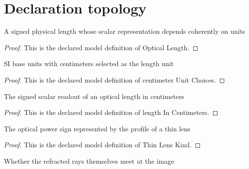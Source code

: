 \section{Declaration topology}
\begin{definition}
  \label{def:physics:phyx-mini-0159:phyxminiproblems-problemphyxmini0159-opticallength}
  A signed physical length whose scalar representation depends coherently on units
\end{definition}
\begin{proof}
  This is the declared model definition of Optical Length.
\end{proof}
\begin{definition}
  \label{def:physics:phyx-mini-0159:phyxminiproblems-problemphyxmini0159-centimeterunitchoices}
  SI base units with centimeters selected as the length unit
\end{definition}
\begin{proof}
  This is the declared model definition of centimeter Unit Choices.
\end{proof}
\begin{definition}
  \label{def:physics:phyx-mini-0159:phyxminiproblems-problemphyxmini0159-lengthincentimeters}
  The signed scalar readout of an optical length in centimeters
\end{definition}
\begin{proof}
  This is the declared model definition of length In Centimeters.
\end{proof}
\begin{definition}
  \label{def:physics:phyx-mini-0159:phyxminiproblems-problemphyxmini0159-thinlenskind}
  The optical power sign represented by the profile of a thin lens
\end{definition}
\begin{proof}
  This is the declared model definition of Thin Lens Kind.
\end{proof}
\begin{definition}
  \label{def:physics:phyx-mini-0159:phyxminiproblems-problemphyxmini0159-imagenature}
  Whether the refracted rays themselves meet at the image
\end{definition}
